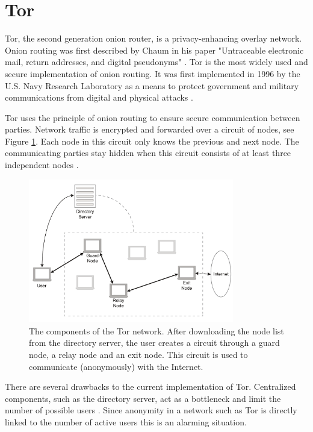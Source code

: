 \section{Tor}
	\label{sec:tor}
	Tor, the second generation onion router, is a privacy-enhancing overlay network. Onion routing was first described by Chaum in his paper "Untraceable electronic mail, return addresses, and digital pseudonyms" \cite{chaum1981untraceable}. Tor is the most widely used and secure implementation of onion routing. It was first implemented in 1996 by the U.S. Navy Research Laboratory as a means to protect government and military communications from digital and physical attacks \cite{goldschlag1996hiding}.
	
	Tor uses the principle of onion routing to ensure secure communication between parties. Network traffic is encrypted and forwarded over a circuit of nodes, see Figure \ref{fig:tor_layout}. Each node in this circuit only knows the previous and next node. The communicating parties stay hidden when this circuit consists of at least three independent nodes \cite{jagerman2014fifteen}.
	
	\begin{figure}[!t]
		\centering
		\includegraphics[width=0.8\textwidth]{prior-work/tor.pdf}
		\caption{The components of the Tor network. After downloading the node list from the directory server, the user creates a circuit through a guard node, a relay node and an exit node. This circuit is used to communicate (anonymously) with the Internet.}
		\label{fig:tor_layout}
	\end{figure}
	
	There are several drawbacks to the current implementation of Tor. Centralized components, such as the directory server, act as a bottleneck and limit the number of possible users \cite{jagerman2014fifteen}. Since anonymity in a network such as Tor is directly linked to the number of active users this is an alarming situation.
